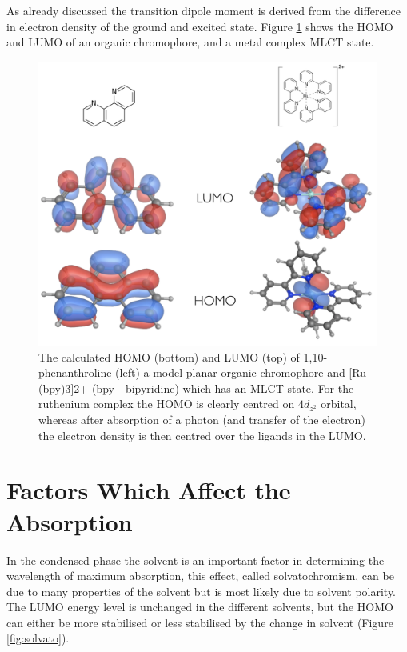 \documentclass[
]{book}
\begin{document}
As already discussed the transition dipole moment is derived from the difference in electron density of the ground and excited state. Figure \ref{fig:PhenRubpy3} shows the HOMO and LUMO of an organic chromophore, and a metal complex MLCT state.

\begin{figure}

{\centering \includegraphics[width=1\linewidth]{images/PhenRubpy3} 

}

\caption{The calculated HOMO (bottom) and LUMO (top) of 1,10-phenanthroline (left) a model planar organic chromophore and [Ru (bpy)3]2+ (bpy - bipyridine) which has an MLCT state. For the ruthenium complex the HOMO is clearly centred on $4d_{z^2}$ orbital, whereas after absorption of a photon (and transfer of the electron) the electron density is then centred over the ligands in the LUMO.}\label{fig:PhenRubpy3}
\end{figure}

\hypertarget{factors-which-affect-the-absorption}{%
\section{Factors Which Affect the Absorption}\label{factors-which-affect-the-absorption}}

In the condensed phase the solvent is an important factor in determining the wavelength of maximum absorption, this effect, called solvatochromism, can be due to many properties of the solvent but is most likely due to solvent polarity. The LUMO energy level is unchanged in the different solvents, but the HOMO can either be more stabilised or less stabilised by the change in solvent (Figure \ref{fig:solvato}).
\end{document}
